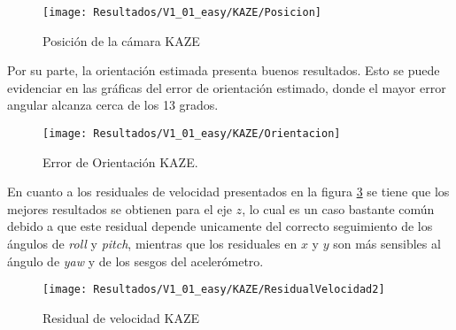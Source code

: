 \begin{figure}[H]
	\centering
	\texttt{[image: Resultados/V1\_01\_easy/KAZE/Posicion]}
	\caption{Posición de la cámara KAZE}
	\label{imagen:Resultados/V1_01_easy/KAZE/Posicion}
\end{figure}


Por su parte, la orientación estimada presenta buenos resultados. Esto se puede evidenciar en las gráficas del error de orientación estimado, donde el mayor error angular alcanza cerca de los 13 grados.

\begin{figure}[H]
	\centering
	\texttt{[image: Resultados/V1\_01\_easy/KAZE/Orientacion]}
	\caption[Error de Orientación KAZE]{Error de Orientación KAZE.}
	\label{imagen:Resultados/V1_01_easy/KAZE/Orientacion}
\end{figure}


En cuanto a los residuales de velocidad presentados en la figura \ref{imagen:Resultados/V1_01_easy/KAZE/ResidualVelocidad} se tiene que los mejores resultados se obtienen para el eje $z$, lo cual es un caso bastante común debido a que este residual depende unicamente del correcto seguimiento de los ángulos de \textit{roll} y \textit{pitch}, mientras que los residuales en $x$ y $y$ son más sensibles al ángulo de \textit{yaw} y de los sesgos del acelerómetro.


\begin{figure}[H]
	\centering
	\texttt{[image: Resultados/V1\_01\_easy/KAZE/ResidualVelocidad2]}
	\caption{Residual de velocidad KAZE}
	\label{imagen:Resultados/V1_01_easy/KAZE/ResidualVelocidad}
\end{figure}



%
%
%
%
%
%
%

